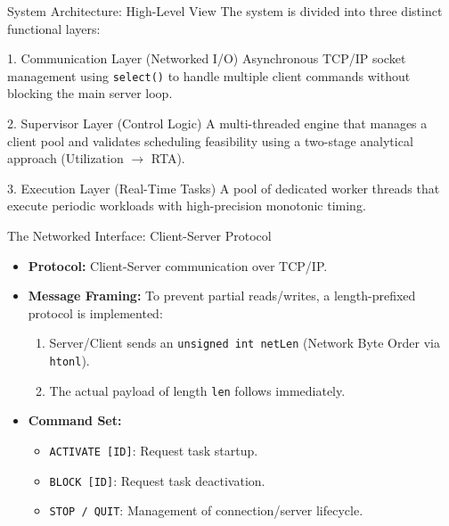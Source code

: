 \begin{frame}{System Architecture: High-Level View}
    The system is divided into three distinct functional layers:
    \begin{block}{1. Communication Layer (Networked I/O)}
        Asynchronous TCP/IP socket management using \texttt{select()} to handle multiple client commands without blocking the main server loop.
    \end{block}
    \begin{block}{2. Supervisor Layer (Control Logic)}
        A multi-threaded engine that manages a client pool and validates scheduling feasibility using a two-stage analytical approach (Utilization $\rightarrow$ RTA).
    \end{block}
    \begin{block}{3. Execution Layer (Real-Time Tasks)}
        A pool of dedicated worker threads that execute periodic workloads with high-precision monotonic timing.
    \end{block}
\end{frame}

\begin{frame}{The Networked Interface: Client-Server Protocol}
    \begin{itemize}
        \item \textbf{Protocol:} Client-Server communication over TCP/IP.
        \item \textbf{Message Framing:} To prevent partial reads/writes, a length-prefixed protocol is implemented:
        \begin{enumerate}
            \item Server/Client sends an \texttt{unsigned int netLen} (Network Byte Order via \texttt{htonl}).
            \item The actual payload of length \texttt{len} follows immediately.
        \end{enumerate}
        \item \textbf{Command Set:} 
        \begin{itemize}
            \item \texttt{ACTIVATE [ID]}: Request task startup.
            \item \texttt{BLOCK [ID]}: Request task deactivation.
            \item \texttt{STOP / QUIT}: Management of connection/server lifecycle.
        \end{itemize}
    \end{itemize}
\end{frame}

